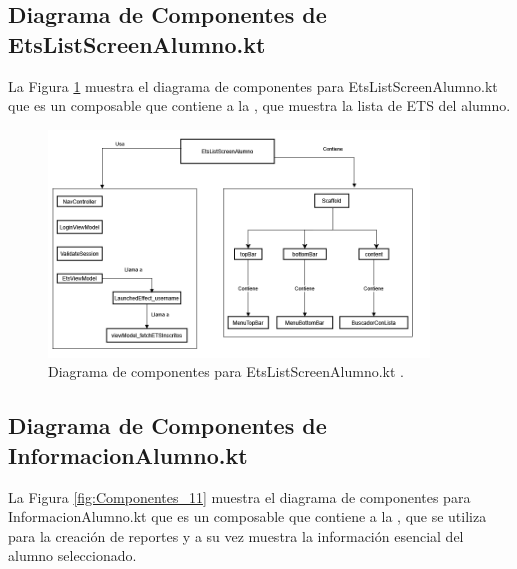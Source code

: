 \newpage

\subsection{Diagrama de Componentes de EtsListScreenAlumno.kt}

La Figura \ref{fig:Componentes_10} muestra el diagrama de componentes para EtsListScreenAlumno.kt que es un composable que contiene a la , que muestra la lista de ETS del alumno.

\begin{figure}[htbp!]
	\begin{center}
		\includegraphics[width=0.9\textwidth]{DiagramasMoviles/DCM (23)}
		\caption{Diagrama de componentes para EtsListScreenAlumno.kt .}
		\label{fig:Componentes_10}
	\end{center}
\end{figure}

\newpage

\subsection{Diagrama de Componentes de InformacionAlumno.kt}

La Figura \ref{fig:Componentes_11} muestra el diagrama de componentes para InformacionAlumno.kt que es un composable que contiene a la , que se utiliza para la creación de reportes y a su vez muestra la información esencial del alumno seleccionado.

